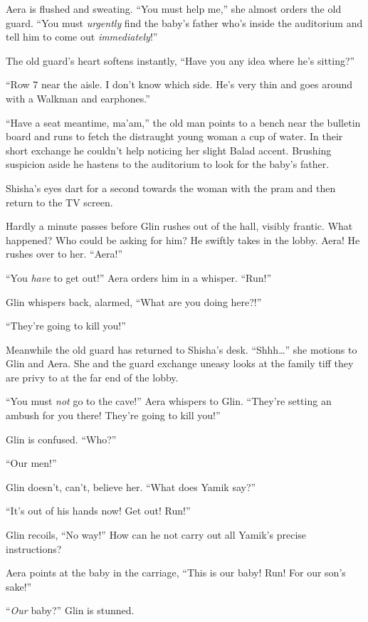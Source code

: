 \documentclass[twoside,11pt]{book}
\begin{document}
Aera is flushed and sweating. ``You must help me,'' she almost orders the old guard.
``You must \textit{urgently} find the baby's father who's inside the auditorium and tell him to come out
\textit{immediately}!''

The old guard's heart softens instantly, ``Have you any idea where he's sitting?''

``Row 7 near the aisle. I don't know which side. He's very thin and goes around with a Walkman and
earphones.''

``Have a seat meantime, ma'am,'' the old man points to a bench near the bulletin board and runs to fetch
the distraught young woman a cup of water. In their short exchange he couldn't help noticing her slight Balad accent.
Brushing suspicion aside he hastens to the auditorium to look for the baby's father.

Shisha's eyes dart for a second towards the woman with the pram and then
return to the TV screen.

Hardly a minute passes before Glin rushes out of the hall, visibly frantic. What happened? Who could be asking for him?
He swiftly takes in the lobby. Aera! He rushes over to her. ``Aera!''

``You \textit{have} to get out!'' Aera orders him in a whisper.
``Run!''

Glin whispers back, alarmed, ``What are you doing here?!''

``They're going to kill you!''

Meanwhile the old guard has returned to Shisha's desk. ``Shhh{\dots}'' she motions to Glin and
Aera. She and the guard exchange uneasy looks at the family tiff they are
privy to at the far end of the lobby.

``You\textit{ }must\textit{ not} go to the cave!'' Aera whispers to Glin.
``They're setting an ambush for you there! They're going to kill you!''

Glin is confused. ``Who?''

``Our men!''

Glin doesn't, can't, believe her. ``What does Yamik say?''

``It's out of his hands now! Get out! Run!''

Glin recoils, ``No way!'' How can he not carry out all Yamik's precise instructions?

Aera points at the baby in the carriage, ``This is our baby! Run! For our son's sake!''

``\textit{Our }baby?'' Glin is stunned.
\end{document}
